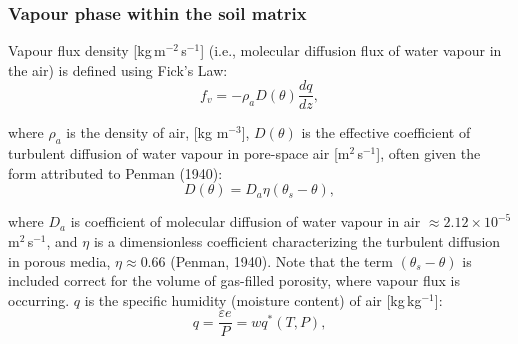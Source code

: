 \documentclass[10pt, letterpapr]{article}
\begin{document}



\subsubsection*{Vapour phase within the soil matrix}

Vapour flux density [kg\,m$^{-2}$\,s$^{-1}$] (i.e., molecular diffusion flux of water vapour in the air) is defined using Fick's Law: %
\[
	f_v=-\rho_a D(\theta) \frac{dq}{dz},
\]

\noindent where $\rho_a$ is the density of air, [kg m$^{-3}$], $D(\theta)$ is the effective coefficient of turbulent diffusion of water vapour in pore-space air [m$^2$\,s$^{-1}$], often given the form attributed to Penman (1940):
\[
	D(\theta)=D_a\eta\left(\theta_s-\theta\right),
\]

\noindent where $D_a$ is coefficient of molecular diffusion of water vapour in air $\approx2.12\times10^{-5}$ m$^2$\,s$^{-1}$, and $\eta$ is a dimensionless coefficient characterizing the turbulent diffusion in porous media, $\eta\approx0.66$ (Penman, 1940). Note that the term $\left(\theta_s-\theta\right)$ is included correct for the volume of gas-filled porosity, where vapour flux is occurring. $q$ is the specific humidity (moisture content) of air [kg\,kg$^{-1}$]:
\[
	q=\frac{\varepsilon e}{P}=wq^*(T,P),
\]
\end{document}
